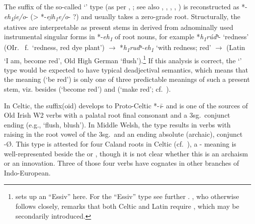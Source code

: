 \documentclass[output=paper,colorlinks,citecolor=brown]{langscibook}
\begin{document}
The suffix of the so-called ‘’ type (as per \citealt{Jasanoff1978}, \citealt{Jasanoff2004}; see also \citealt{Peters2007}, \citealt{Kummel2012}, \citealt{Malzahn2014}, \citealt{Peters2016}, \citealt{Jasanoff2021}) is reconstructed as *-\textit{eh\textsubscript{1}i̯e/o}- (> *-\textit{ei̯h\textsubscript{1}e/o}- ?) and usually takes a zero-grade root. Structurally, the statives are interpretable as  present stems in   derived from adnominally  used instrumental singular forms in *-\textit{eh\textsubscript{1}} of root nouns, for example *\textit{h\textsubscript{1}rúdʰ}- ‘redness’ (OIr.\   f.\ ‘redness, red dye plant’) $\rightarrow$ *\textit{h\textsubscript{1}rudʰ-eh\textsubscript{1}} ‘with redness; red’ $\rightarrow$  (Latin  ‘I am, become red’, Old High German  ‘flush’).\footnote{ sets up an “Essiv”  here. For the “Essiv” type see further . \citet[41--42]{Schumacher2004}, who otherwise follows  closely, remarks that both Celtic and Latin require , which may be secondarily introduced.} If this analysis is correct, the ‘’ type would be expected to have typical deadjectival  semantics, which means that the  meaning (‘be red’) is only one of three predictable meanings of such a present stem, viz. besides  (‘become red’) and  (‘make red’; cf.\ \citealt[94, n. 43]{Malzahn2014}).

In Celtic, the suffix(oid)  develops to Proto-Celtic *-\textit{ī}- and is one of the sources of Old Irish W2 verbs with a palatal root final consonant and a 3sg.\ conjunct ending  (e.g.,  ‘flush, blush’). In Middle Welsh, the  type results in verbs with raising in the root vowel of the 3sg.\ and an ending absolute  (archaic), conjunct -{\O}. This type is attested for four Caland roots in Celtic (cf.\ \citealt[41--42]{Schumacher2004}), a - meaning is well-represented beside the  or , though it is not clear whether this is an archaism or an innovation. Three of those four verbs have cognates in other branches of Indo-European.
\end{document}
